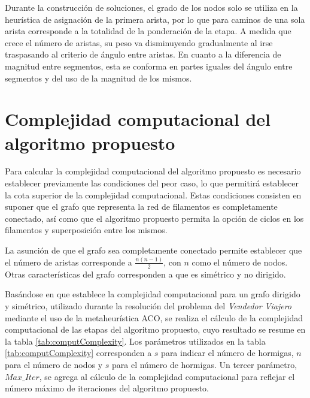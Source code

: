 Durante la construcci\'on de soluciones, el grado de los nodos solo se utiliza en la heur\'istica de asignaci\'on de la primera arista, por lo que para caminos de una sola arista corresponde a la totalidad de la ponderaci\'on de la etapa. A medida que crece el n\'umero de aristas, su peso va disminuyendo gradualmente al irse traspasando al criterio de \'angulo entre aristas. En cuanto a la diferencia de magnitud entre segmentos, esta se conforma en partes iguales del \'angulo entre segmentos y del uso de la magnitud de los mismos.

\section{Complejidad computacional del algoritmo propuesto}
\label{sec:compComplexity}

Para calcular la complejidad computacional del algoritmo propuesto es necesario establecer previamente las condiciones del peor caso, lo que permitir\'a establecer la cota superior de la complejidad computacional. Estas condiciones consisten en suponer que el grafo que representa la red de filamentos es completamente conectado, as\'i como que el algoritmo propuesto permita la opci\'on de ciclos en los filamentos y superposici\'on entre los mismos.

La asunci\'on de que el grafo sea completamente conectado permite establecer que el n\'umero de aristas corresponde a $\frac{n(n-1)}{2}$, con $n$ como el n\'umero de nodos. Otras caracter\'isticas del grafo corresponden a que es sim\'etrico y no dirigido.

Bas\'andose en \citet{li2015efficiency} que establece la complejidad computacional para un grafo dirigido y sim\'etrico, utilizado durante la resoluci\'on del problema del {\it Vendedor Viajero} mediante el uso de la metaheur\'istica ACO, se realiza el c\'alculo de la complejidad computacional de las etapas del algoritmo propuesto, cuyo resultado se resume en la tabla \ref{tab:computComplexity}. Los par\'ametros utilizados en la tabla \ref{tab:computComplexity} corresponden a $s$ para indicar el n\'umero de hormigas, $n$ para el n\'umero de nodos y $s$ para el n\'umero de hormigas. Un tercer par\'ametro, $Max\_Iter$, se agrega al c\'alculo de la complejidad computacional para reflejar el n\'umero m\'aximo de iteraciones del algoritmo propuesto.



